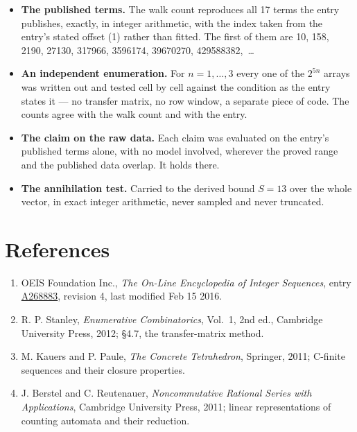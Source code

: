 \documentclass[11pt]{article}
\theoremstyle{definition}
\begin{document}
\begin{itemize}

\item {\bfseries The published terms.} The walk count reproduces all 17 terms the entry publishes, exactly, in integer arithmetic, with the index taken from the entry's stated offset (1) rather than fitted. The first of them are 10, 158, 2190, 27130, 317966, 3596174, 39670270, 429588382,~\dots

\item {\bfseries An independent enumeration.} For $n = 1,\dots,3$ every one of the $2^{5n}$ arrays was written out and tested cell by cell against the condition as the entry states it --- no transfer matrix, no row window, a separate piece of code. The counts agree with the walk count and with the entry.

\item {\bfseries The claim on the raw data.} Each claim was evaluated on the entry's published terms alone, with no model involved, wherever the proved range and the published data overlap. It holds there.

\item {\bfseries The annihilation test.} Carried to the derived bound $S = 13$ over the whole vector, in exact integer arithmetic, never sampled and never truncated.

\end{itemize}

\section{References}

\begin{enumerate}

\item OEIS Foundation Inc., \emph{The On-Line Encyclopedia of Integer Sequences}, entry \href{https://oeis.org/A268883}{A268883}, revision 4, last modified Feb 15 2016.

\item R. P. Stanley, \emph{Enumerative Combinatorics}, Vol.~1, 2nd ed., Cambridge University Press, 2012; \S4.7, the transfer-matrix method.

\item M. Kauers and P. Paule, \emph{The Concrete Tetrahedron}, Springer, 2011; C-finite sequences and their closure properties.

\item J. Berstel and C. Reutenauer, \emph{Noncommutative Rational Series with Applications}, Cambridge University Press, 2011; linear representations of counting automata and their reduction.

\end{enumerate}
\end{document}
